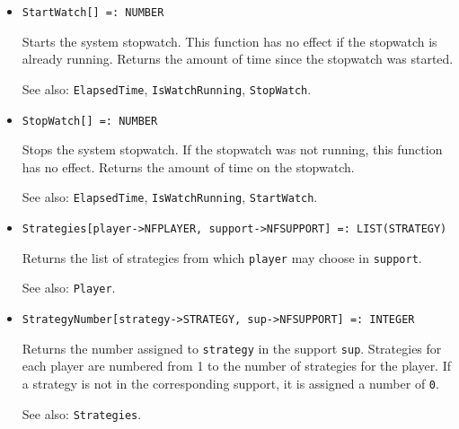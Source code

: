 \begin{itemize}
{\it for all types} {\tt T}
\bd
Returns a list consisting of the elements of \verb+list+, sorted
according to the ordering of the elements of \verb+by+.  It is an
error if \verb+list+ and \verb+by+ do not have the same dimensionality.
\ed

\item{}
\protect \large \begin{verbatim}
StartWatch[] =: NUMBER 
\end{verbatim}\normalsize

\bd
Starts the system stopwatch.  This function has no
effect if the stopwatch is already running.
Returns the amount of time since the stopwatch was started.
\item [See also:] \verb+ElapsedTime+, \verb+IsWatchRunning+, \verb+StopWatch+.
\ed

\item{}
\protect \large \begin{verbatim}
StopWatch[] =: NUMBER 
\end{verbatim}\normalsize

\bd
Stops the system stopwatch.  If the stopwatch was not
running, this function has no effect.  Returns the amount of time
on the stopwatch.
\item [See also:] \verb+ElapsedTime+, \verb+IsWatchRunning+,
\verb+StartWatch+.
\ed

\item{}
\protect \large \begin{verbatim}
Strategies[player->NFPLAYER, support->NFSUPPORT] =: LIST(STRATEGY) 
\end{verbatim}\normalsize

\bd
Returns the list of strategies from which  \verb+player+ may choose
in \verb+support+.
\item [See also:] \verb+Player+. 
\ed

\item{}
\protect \large \begin{verbatim}
StrategyNumber[strategy->STRATEGY, sup->NFSUPPORT] =: INTEGER
\end{verbatim}\normalsize

\bd 
Returns the number assigned to \verb+strategy+ in the support
\verb+sup+.  Strategies  for each player are numbered from 1 to
the number of strategies for the player.  If a strategy is not in
the corresponding support, it is assigned a number of
\verb+0+.
\item [See also:] \verb+Strategies+. 
\ed


\end{itemize}
